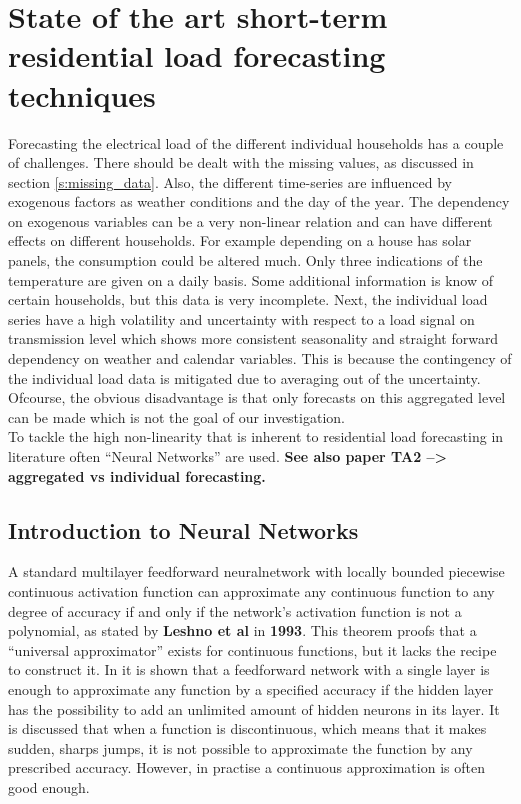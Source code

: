 \chapter{State of the art short-term residential load forecasting techniques}
\label{cha:State of the art short-term residential load forecasting techniques}
Forecasting the electrical load of the different individual households has a couple of challenges. There should be dealt with the missing values, as discussed in section \ref{s:missing_data}. Also, the different time-series are influenced by exogenous factors as weather conditions and the day of the year. The dependency on exogenous variables can be a very non-linear relation and can have different effects on different households. For example depending on a house has solar panels, the consumption could be altered much. Only three indications of the temperature are given on a daily basis. Some additional information is know of certain households, but this data is very incomplete. Next, the individual load series have a high volatility and uncertainty with respect to a load signal on transmission level which shows more consistent seasonality and straight forward dependency on weather and calendar variables. This is because the contingency of the individual load data is mitigated due to averaging out of the uncertainty. Ofcourse, the obvious disadvantage is that only forecasts on this aggregated level can be made which is not the goal of our investigation.\\ To tackle the high non-linearity that is inherent to residential load forecasting in literature often ``Neural Networks'' are used.
\textbf{See also paper TA2 --> aggregated vs individual forecasting.}

\section{Introduction to Neural Networks}
A  standard multilayer feedforward neuralnetwork with locally bounded piecewise continuous activation function can approximate any continuous function to any degree of accuracy if and only if the network's activation function is not a polynomial, as stated by \textbf{Leshno et al} in \textbf{1993}. This theorem proofs that a ``universal approximator'' exists for continuous functions, but it lacks the recipe to construct it. In \cite{Nielsen2015} it is shown that a feedforward network with a single layer is enough to approximate any function by a specified accuracy if the hidden layer has the possibility to add an unlimited amount of hidden neurons in its layer. It is discussed that when a function is discontinuous, which means that it makes sudden, sharps jumps, it is not possible to approximate the function by any prescribed accuracy. However, in practise a continuous approximation is often good enough.\\


